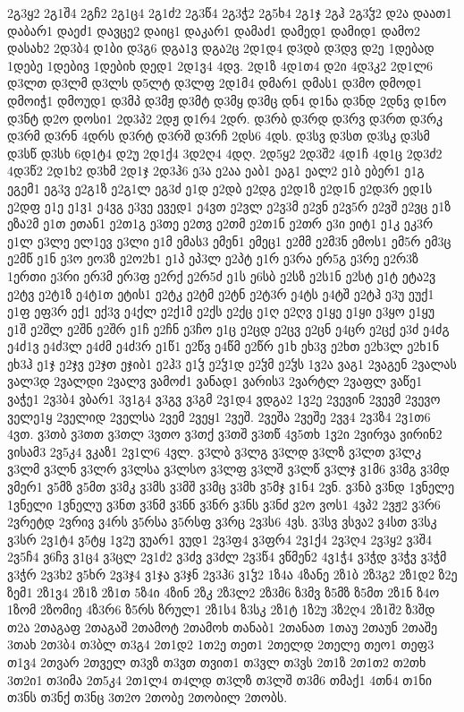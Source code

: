 {2გ3ყ2
2გ1შ4
2გჩ2
2გ1ც4
2გ1ძ2
2გ3წ4
2გ3ჭ2
2გ5ხ4
2გ1ჯ
2გჰ
2გ3ჴ2
დ2ა
დაათ1
დაბარ1
დაეძ1
დავცე2
დაიც1
დაკარ1
დამაძ1
დამედ1
დამიდ1
დამო2
დასახ2
2დ3ბ4
დ1ბი
დ3გ6
დგა1ვ
დგა2ც
2დ1დ4
დ3დბ
დ3დვ
დ2ე
1დებად
1დებე
1დებივ
1დებიხ
დედ1
2დ1ვ4
4დვ.
2დ1ზ
4დ1თ4
დ2ი
4დ3კ2
2დ1ლ6
დ3ლთ
დ3ლმ
დ3ლს
დ5ლტ
დ3ლფ
2დ1მ4
დმარ1
დმას1
დ3მო
დმოდ1
დმოიჭ1
დმოუდ1
დ3მპ
დ3მჟ
დ3მტ
დ3მყ
დ3მც
დნ4
დ1ნა
დ3ნდ
2დნვ
დ1ნო
დ3ნტ
დ2ო
დოსი1
2დ3პ2
2დჟ
დ1რ4
2დრ.
დ3რბ
დ3რდ
დ3რვ
დ3რთ
დ3რკ
დ3რმ
დ3რნ
4დრს
დ3რტ
დ3რშ
დ3რჩ
2დს6
4დს.
დ3სვ
დ3სთ
დ3სკ
დ3სმ
დ3სწ
დ3სხ
6დ1ტ4
დ2უ
2დ1ქ4
3დ2ღ4
4დღ.
2დ5ყ2
2დ3შ2
4დ1ჩ
4დ1ც
2დ3ძ2
4დ3წ2
2დ1ხ2
დ3ხმ
2დ1ჯ
2დ3ჰ6
ე3ა
ე2აა
ეაბ1
ეაგ1
ეალ2
ე1ბ
ებერ1
ე1გ
ეგემ1
ეგ3ვ
ე2გ1ზ
ე2გ1ლ
ეგ3ძ
ე1დ
ე2დბ
ე2დგ
ე2დ1ზ
ე2დ1ნ
ე2დ3რ
ედ1ს
ე2დფ
ე1ე
ე1ვ1
ე4ვგ
ე3ვე
ევედ1
ე4ვთ
ე2ვლ
ე2ვ3მ
ე2ვნ
ე2ვ5რ
ე2ვშ
ე2ვც
ე1ზ
ეზა2მ
ე1თ
ეთან1
ე2თ1გ
ე3თე
ე2თვ
ე2თმ
ე2თ1ნ
ე2თრ
ე3ი
ეიტ1
ე1კ
ეკ3რ
ე1ლ
ე3ლე
ელ1ევ
ე3ლი
ე1მ
ემას3
ემენ1
ემეც1
ე2მმ
ე2მ3ნ
ემოს1
ემ5რ
ემ3ც
ე2მწ
ე1ნ
ე3ო
ეო3ზ
ე2ო2ხ1
ე1პ
ეპ3ლ
ე2პტ
ე1რ
ე3რა
ერ5გ
ე3რე
ე2რ3ზ
1ერთი
ე3რი
ერ3მ
ერ3ფ
ე2რქ
ე2რ5ძ
ე1ს
ე6სბ
ე2სზ
ე2ს1ნ
ე2სტ
ე1ტ
ეტა2ვ
ე2ტვ
ე2ტ1ზ
ე4ტ1თ
ეტის1
ე2ტკ
ე2ტმ
ე2ტნ
ე2ტ3რ
ე4ტს
ე4ტშ
ე2ტჰ
ე3უ
ეუქ1
ე1ფ
ეფ3რ
ექ1
ექ3ვ
ე4ქლ
ე2ქ1მ
ე2ქს
ე2ქც
ე1ღ
ე2ღვ
ე1ყე
ე1ყი
ე3ყო
ე1ყუ
ე1შ
ე2შლ
ე2შნ
ე2შრ
ე1ჩ
ე2ჩნ
ე3ჩო
ე1ც
ე2ცდ
ე2ცვ
ე2ცნ
ე4ცრ
ე2ცქ
ე3ძ
ე4ძგ
ე4ძ1ვ
ე4ძ3ლ
ე4ძმ
ე4ძ3რ
ე1წ1
ე2წვ
ე4წმ
ე2წრ
ე1ხ
ეხ3ვ
ე2ხთ
ე2ხ3ლ
ე2ხ1ნ
ეხ3ჰ
ე1ჯ
ე2ჯვ
ე2ჯთ
ეჯიბ1
ე2ჰ3
ე1ჴ
ე2ჴ1დ
ე2ჴმ
ე2ჴს
1ვ2ა
ვაგ1
2ვაგენ
2ვალას
ვალ3დ
2ვალდი
2ვალვ
ვამოძ1
ვანად1
ვარის3
2ვარტლ
2ვაფლ
ვაწე1
ვაჭე1
2ვ3ბ4
ვბარ1
3ვ1გ4
ვ3გვ
ვ3გმ
2ვ1დ4
ვდგა2
1ვ2ე
2ვევინ
2ვევმ
2ვევო
ველე1ყ
2ველიდ
2ველსა
2ვემ
2ვეყ1
2ვეშ.
2ვეშა
2ვეშე
2ვვ4
2ვ3ზ4
2ვ1თ6
4ვთ.
ვ3თბ
ვ3თთ
ვ3თლ
3ვთო
ვ3თქ
ვ3თშ
ვ3თწ
4ვ5თხ
1ვ2ი
2ვირვა
ვირინ2
ვისამ3
2ვ5კ4
ვკაზ1
2ვ1ლ6
4ვლ.
ვ3ლბ
ვ3ლგ
ვ3ლდ
ვ3ლზ
ვ3ლთ
ვ3ლკ
ვ3ლმ
ვ3ლნ
ვ3ლრ
ვ3ლსა
ვ3ლსო
ვ3ლფ
ვ3ლშ
ვ3ლწ
ვ3ლჯ
ვ1მ6
ვ3მგ
ვ3მდ
ვმერ1
ვ5მზ
ვ5მთ
ვ3მკ
ვ3მს
ვ3მშ
ვ3მც
ვ3მხ
ვ5მჯ
ვ1ნ4
2ვნ.
ვ3ნბ
ვ3ნდ
1ვნელე
1ვნელი
1ვნელუ
ვ3ნთ
ვ3ნმ
ვ3ნნ
ვ3ნრ
ვ3ნს
ვ3ნძ
ვ2ო
ვოს1
4ვპ2
2ვჟ2
ვ3რ6
2ვრეტდ
2ვრივ
ვ4რს
ვ5რსა
ვ5რსფ
ვ3რც
2ვ3ს6
4ვს.
ვ3სვ
ვსვა2
ვ4სთ
ვ3სკ
ვ3სრ
2ვ1ტ4
ვ5ტყ
1ვ2უ
ვუარ1
ვუდ1
2ვ3ფ4
ვ3ფრ4
2ვ1ქ4
2ვ3ღ4
2ვ3ყ2
ვ3შ4
2ვ5ჩ4
ვ6ჩვ
ვ1ც4
ვ3ცლ
2ვ1ძ2
ვ3ძვ
ვ3ძლ
2ვ3წ4
ვწმენ2
4ვ1ჭ4
ვ3ჭდ
ვ3ჭვ
ვ3ჭმ
ვ3ჭრ
2ვ3ხ2
ვ5ხრ
2ვ3ჯ4
ვ1ჯა
ვ3ჯნ
2ვ3ჰ6
ვ1ჴ2
1ზ4ა
4ზანე
2ზ1ბ
2ზ3გ2
2ზ1დ2
ზ2ე
ზემ1
2ზ1ვ4
2ზ1ზ
2ზ1თ
5ზ4ი
4ზინ
2ზკ
2ზ3ლ2
2ზ3მ6
ზ3მვ
ზ5მზ
ზ5მთ
2ზ1ნ
ზ4ო
1ზომ
2ზომიე
4ზ3რ6
ზ5რს
ზრულ1
2ზ1ს4
ზ3სკ
2ზ1ტ
1ზ2უ
3ზ2ღ4
2ზ1შ2
ზ3შდ
თ2ა
2თაგაფ
2თაგაშ
2თამოტ
2თამოხ
თანაბ1
2თანათ
1თაუ
2თაუნ
2თაშე
3თახ
2თ3ბ4
თ3ბლ
თ3გ4
2თ1დ2
1თ2ე
თეთ1
2თელდ
2თელე
თეო1
თეფ3
თ1ვ4
2თვარ
2თველ
თ3ვზ
თ3ვთ
თვით1
თ3ვლ
თ3ვს
2თ1ზ
2თ1თ2
თ2თხ
3თ2ი1
თ3იმა
2თ5კ4
2თ1ლ4
თ4ლდ
თ3ლზ
თ3ლშ
თ3მ6
თმაქ1
4თნ4
თ1ნი
თ3ნს
თ3ნქ
თ3ნც
3თ2ო
2თობე
2თობილ
2თობს.
}
